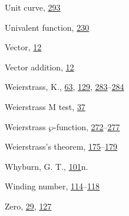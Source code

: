 \begin{theindex}
\item Unit curve, \hyperlink{orig-p293}{293}
\item Univalent function, \hyperlink{orig-p230}{230}
\item Vector, \hyperlink{orig-p12}{12}
\item Vector addition, \hyperlink{orig-p12}{12}
\item Weierstrass, K., \hyperlink{orig-p63}{63}, \hyperlink{orig-p129}{129}, \hyperlink{orig-p283}{283}--\hyperlink{orig-p284}{284}
\item Weierstrass M test, \hyperlink{orig-p37}{37}
\item Weierstrass $\wp$-function, \hyperlink{orig-p272}{272}--\hyperlink{orig-p277}{277}
\item Weierstrass's theorem, \hyperlink{orig-p175}{175}--\hyperlink{orig-p179}{179}
\item Whyburn, G. T., \hyperlink{orig-p101}{101}n.
\item Winding number, \hyperlink{orig-p114}{114}--\hyperlink{orig-p118}{118}
\item Zero, \hyperlink{orig-p29}{29}, \hyperlink{orig-p127}{127}
\end{theindex}
